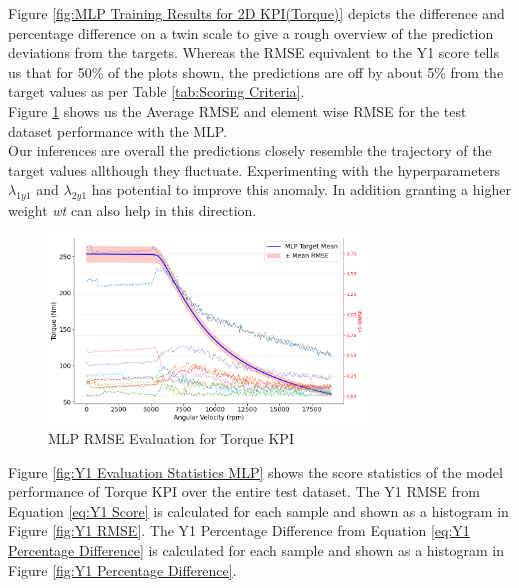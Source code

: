 \documentclass{report} %
\begin{document}
Figure \ref{fig:MLP Training Results for 2D KPI(Torque)} depicts the difference and percentage difference on a twin scale to give a rough overview of the prediction deviations from the targets.
Whereas the \ac{RMSE} equivalent to the Y1 score tells us that for 50\% of the plots shown, the predictions are off by about 5\% from the target values as per Table \ref{tab:Scoring Criteria}.\\
Figure \ref{fig:MLP RMSE Evaluation for 2D KPI(Torque)} shows us the Average \ac{RMSE} and element wise \ac{RMSE} for the test dataset performance with the \ac{MLP}. \\
Our inferences are overall the predictions closely resemble the trajectory of the target values allthough they fluctuate.
Experimenting with the hyperparameters \textit{$\lambda_{1y1}$} and \textit{$\lambda_{2y1}$} has potential to improve this anomaly. 
In addition granting a higher weight \textit{wt} can also help in this direction.\\
\begin{figure}[H]
    \centering
    \includegraphics[width=0.75\textwidth]{./ReportImages/RMSE_MLP_y1.png} 
    \caption{\ac{MLP} \ac{RMSE} Evaluation for Torque \ac{KPI}} 
    \label{fig:MLP RMSE Evaluation for 2D KPI(Torque)}
\end{figure}


Figure \ref{fig:Y1 Evaluation Statistics MLP} shows the score statistics of the model performance of Torque \ac{KPI} over the entire test dataset.
The Y1 \ac{RMSE} from Equation \ref{eq:Y1 Score} is calculated for each sample and shown as a histogram in Figure \ref{fig:Y1 RMSE}.
The Y1 Percentage Difference from Equation \ref{eq:Y1 Percentage Difference} is calculated for each sample and shown as a histogram in Figure \ref{fig:Y1 Percentage Difference}.\\
\end{document}
